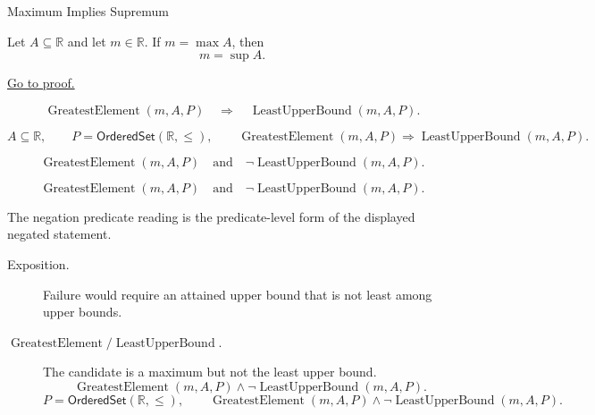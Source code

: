 \begin{propositionbox}{Maximum Implies Supremum}
\begin{proposition}
\label{prop:maximum-implies-supremum}
Let $A\subseteq\mathbb{R}$ and let $m\in\mathbb{R}$. If $m=\max A$, then
\[
  m=\sup A.
\]

\hyperref[prf:maximum-implies-supremum]{Go to proof.}
\end{proposition}
\end{propositionbox}

\begin{remark*}
\[
  \operatorname{GreatestElement}(m,A,P)
  \quad\Longrightarrow\quad
  \operatorname{LeastUpperBound}(m,A,P).
\]
\end{remark*}

\begin{remark*}
\[
  A\subseteq\mathbb{R},\qquad P=\mathsf{OrderedSet}(\mathbb{R},\leq),\qquad
  \operatorname{GreatestElement}(m,A,P)\Longrightarrow
  \operatorname{LeastUpperBound}(m,A,P).
\]
\end{remark*}

\begin{remark*}
\[
  \operatorname{GreatestElement}(m,A,P)
  \quad\text{and}\quad
  \neg\operatorname{LeastUpperBound}(m,A,P).
\]
\end{remark*}

\begin{remark*}
\[
  \operatorname{GreatestElement}(m,A,P)
  \quad\text{and}\quad
  \neg\operatorname{LeastUpperBound}(m,A,P).
\]

The negation predicate reading is the predicate-level form of the displayed negated statement.
\end{remark*}

\begin{remark*}
\begin{description}
  \item[Exposition.]
  Failure would require an attained upper bound that is not least among
  upper bounds.

  \item[\(\operatorname{GreatestElement} / \operatorname{LeastUpperBound}.\)]
  The candidate is a maximum but not the least upper bound.
  \[
    \operatorname{GreatestElement}(m,A,P)\land
    \neg\operatorname{LeastUpperBound}(m,A,P).
  \]
  \[
    P=\mathsf{OrderedSet}(\mathbb{R},\leq),\qquad
    \operatorname{GreatestElement}(m,A,P)\land
    \neg\operatorname{LeastUpperBound}(m,A,P).
  \]
\end{description}
\end{remark*}

